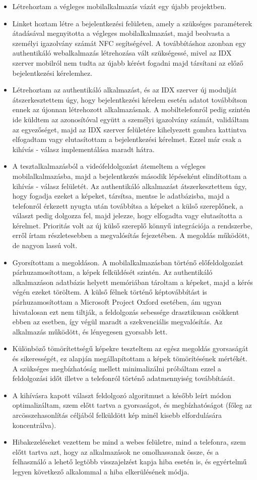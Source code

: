 \begin{itemize}
\item Létrehoztam a végleges mobilalkalmazás vázát egy újabb projektben.
\item Linket hoztam létre a bejelentkezési felületen, amely a szükséges paraméterek átadásával megnyitotta a végleges mobilalkalmazást, majd beolvasta a személyi igazolvány számát NFC segítségével. A továbbításhoz azonban egy authentikáló webalkalmazás létrehozása vált szükségessé, mivel az IDX szerver mobilról nem tudta az újabb kérést fogadni majd társítani az előző bejelentkezési kérelemhez.
\item Létrehoztam az authentikáló alkalmazást, és az IDX szerver új modulját átszerkesztettem úgy, hogy bejelentkezési kérelem esetén adatot továbbítson ennek az újonnan létrehozott alkalmazásnak. A mobiltelefonról pedig szintén ide küldtem az azonosítóval együtt a személyi igazolvány számát, validáltam az egyezőséget, majd az IDX szerver felületére kihelyezett gombra kattintva elfogadtam vagy elutasítottam a bejelentkezési kérelmet. Ezzel már csak a kihívás - válasz implementálása maradt hátra.
\item A tesztalkalmazásból a videófeldolgozást átemeltem a végleges mobilalkalmazásba, majd a bejelentkezés második lépéseként elindítottam a kihívás - válasz felületét. Az authentikáló alkalmazást átszerkesztettem úgy, hogy fogadja ezeket a képeket, társítsa, mentse le adatbázisba, majd a telefonról érkezett nyugta után továbbítsa a képeket a külső szereplőnek, a választ pedig dolgozza fel, majd jelezze, hogy elfogadta vagy elutasította a kérelmet. Prioritás volt az új külső szereplő könnyű integrációja a rendszerbe, erről írtam részletesebben a megvalósítás fejezetében. A megoldás működött, de nagyon lassú volt.
\item Gyorsítottam a megoldáson. A mobilalkalmazásban történő előfeldolgozást párhuzamosítottam, a képek felküldését szintén. Az authentikáló alkalmazáson adatbázis helyett memóriában tároltam a képeket, majd a kérés végén ezeket töröltem. A külső félnek történő képtovábbítást is párhuzamosítottam a Microsoft Project Oxford esetében, ám ugyan hivatalosan ezt nem tiltják, a feldolgozás sebessége drasztikusan csökkent ebben az esetben, így végül maradt a szekvenciális megvalósítás. Az alkalmazás működött, és lényegesen gyorsabb lett.
\item Különböző tömörítettségű képekre teszteltem az egész megoldás gyorsaságát és sikerességét, ez alapján megállapítottam a képek tömörítésének mértékét. A szükséges megbízhatóság mellett minimalizálni próbáltam ezzel a feldolgozási időt illetve a telefonról történő adatmennyiség továbbítását.
\item A kihívásra kapott választ feldolgozó algoritmust a később leírt módon optimalizáltam, szem előtt tartva a gyorsaságot, és megbízhatóságot (főleg az arcösszehasonlítás céljából felküldött kép minél kisebb elfordulására koncentrálva).
\item Hibakezeléseket vezettem be mind a webes felületre, mind a telefonra, szem előtt tartva azt, hogy az alkalmazások ne omolhassanak össze, és a felhasználó a lehető legtöbb visszajelzést kapja hiba esetén is, és egyértelmű legyen következő alkalommal a hiba elkerülésének módja.
\end{itemize}
\newpage